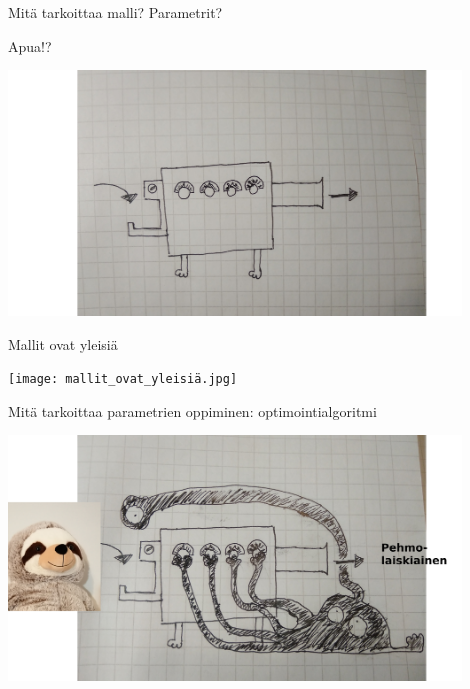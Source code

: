 \documentclass[presentation]{beamer}
\begin{document}
\begin{frame}{Mitä tarkoittaa malli? Parametrit?}

Apua!?
\pause

\includegraphics[width=0.9\textwidth]{malli_uusi.jpg}



\end{frame}

\begin{frame}{Mallit ovat yleisiä}

\texttt{[image: mallit\_ovat\_yleisiä.jpg]}



\end{frame}

\begin{frame}{Mitä tarkoittaa parametrien oppiminen: optimointialgoritmi}


\includegraphics[width=0.9\textwidth]{malli_parametrit_lasse.jpg}


\end{frame}
\end{document}
